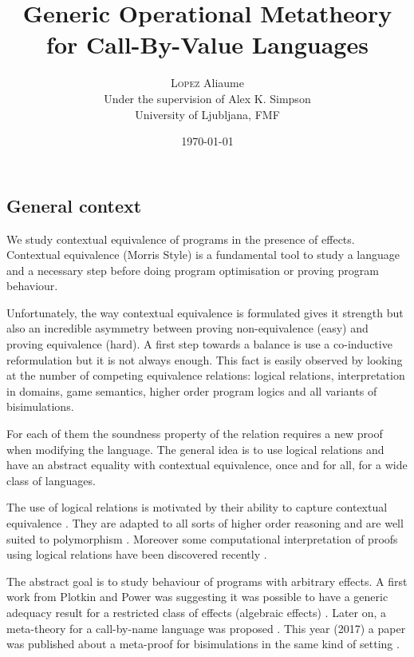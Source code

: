 \documentclass{article}
\newenvironment{point}[1]%
{\subsection*{#1}}%
{}
\begin{document}
\title{Generic Operational Metatheory \\ for Call-By-Value Languages}

\author{\textsc{Lopez} Aliaume \\
{\small Under the supervision of Alex K. Simpson} \\
{\small University of Ljubljana, FMF}}

\date{\today}

\maketitle

\pagestyle{empty} %
\thispagestyle{empty}



\begin{point}{General context}

    We study contextual equivalence of programs in the presence of 
    effects. Contextual equivalence (Morris Style) is a fundamental 
    tool to study a language and a necessary step before doing
    program optimisation or proving program behaviour.
    
    Unfortunately, the way contextual equivalence is formulated 
    gives it strength but also an incredible asymmetry between 
    proving non-equivalence (easy) and proving equivalence (hard). 
    A first step towards a balance is use a co-inductive 
    reformulation \cite{lassen1998relational} but it is 
    not always enough. This fact is easily observed by 
    looking at the number of competing equivalence relations:
    logical relations, interpretation in domains, game semantics,
    higher order program logics and all variants of bisimulations.

    For each of them
    the soundness property of the relation requires a new proof 
    when modifying the language. The general idea is to use logical relations
    and have an abstract equality with contextual equivalence, 
    once and for all,
    for a wide class of languages.

    The use of logical relations is motivated by their ability
    to capture contextual equivalence 
    \cite{pitts1997operationally}. They are adapted to all sorts 
    of higher order reasoning \cite{Pitts2000} and are well suited 
    to polymorphism \cite{wadler1989theorems}. Moreover 
    some computational interpretation of proofs using logical relations
    have been discovered recently \cite{dagand2015normalization}.

    The abstract goal is to study behaviour of programs with arbitrary 
    effects. A first work from Plotkin and Power was suggesting 
    it was possible to have a generic adequacy result  
    for a restricted class of effects (algebraic effects) \cite{plotkin2001adequacy}.
    Later on, a meta-theory for a call-by-name language was 
    proposed \cite{gom}. This year (2017) a paper 
    was published about a meta-proof for bisimulations 
    in the same kind of setting \cite{Ugo2017}.

\end{point}
\end{document}
